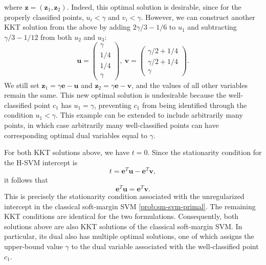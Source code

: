\documentclass[twoside,11pt]{article}
\renewcommand\u{\bm{u}}
\renewcommand\v{\bm{v}}
\newcommand\z{\bm{z}}
\newcommand\e{\bm{e}}
\begin{document}
  where $\z = (\z_1,\z_2)$.
  Indeed, this optimal solution is desirable, since for the properly classified points, $u_i < \gamma$ and $v_i < \gamma$. However, we can
  construct another KKT solution from the above by adding $2\gamma/3 - 1/6$ to $u_1$ and subtracting $\gamma/3 - 1/12$ from both
  $u_2$ and $u_3$:
  \[
    \u = \begin{pmatrix}
      \gamma\\
      1/4\\
      1/4\\
      \gamma
    \end{pmatrix},\ 
    \v = \begin{pmatrix}
      \gamma/2 + 1/4\\
      \gamma/2 + 1/4\\
      \gamma
    \end{pmatrix}.
  \]
  We still set $\z_1 = \gamma\e - \u$ and $\z_2 = \gamma\e - \v$, and the values of all other variables remain the same.
  This new optimal solution is undesirable because the well-classified point $c_1$ has $u_1=\gamma$, preventing $c_1$ from being identified through the condition $u_1<\gamma$.
  This example can be extended to include arbitrarily many points, in which case arbitrarily many well-classified points can have corresponding optimal dual variables equal to $\gamma$.
  
For both KKT solutions above, we have $t=0$. Since the stationarity condition for the H-SVM intercept is
\[
    t=\e^T\u-\e^T\v,
\]
it follows that
\[
    \e^T\u=\e^T\v.
\]
This is precisely the stationarity condition associated with the unregularized intercept in the classical soft-margin SVM \eqref{prob:sm-svm-primal}. The remaining KKT conditions are identical for the two formulations. Consequently, both solutions above are also KKT solutions of the classical soft-margin SVM. In particular, its dual also has multiple optimal solutions, one of which assigns the upper-bound value $\gamma$ to the dual variable associated with the well-classified point $c_1$.
  
\end{document}
